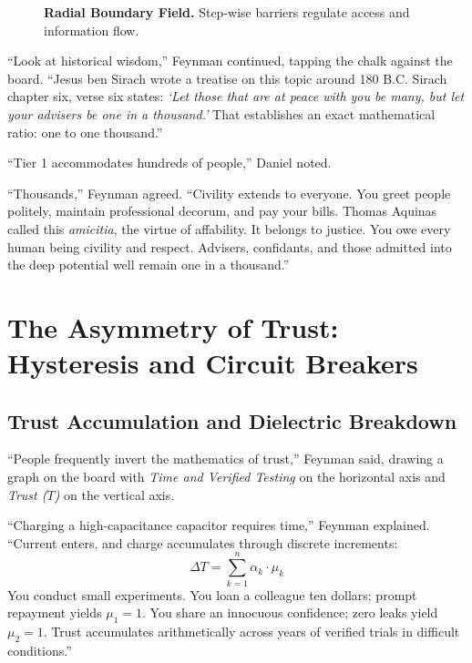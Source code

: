 \documentclass[11pt]{report}
\begin{document}
\begin{figure}[H]
\caption{\textbf{Radial Boundary Field.} Step-wise barriers regulate access and information flow.}
\label{fig:radialfield}
\end{figure}

``Look at historical wisdom,'' Feynman continued, tapping the chalk against the board. ``Jesus ben Sirach wrote a treatise on this topic around 180 B.C. Sirach chapter six, verse six states: \textit{`Let those that are at peace with you be many, but let your advisers be one in a thousand.'} That establishes an exact mathematical ratio: one to one thousand.''

``Tier 1 accommodates hundreds of people,'' Daniel noted.

``Thousands,'' Feynman agreed. ``Civility extends to everyone. You greet people politely, maintain professional decorum, and pay your bills. Thomas Aquinas called this \textit{amicitia}, the virtue of affability. It belongs to justice. You owe every human being civility and respect. Advisers, confidants, and those admitted into the deep potential well remain one in a thousand.''

\chapter{The Asymmetry of Trust: Hysteresis and Circuit Breakers}

\section{Trust Accumulation and Dielectric Breakdown}
``People frequently invert the mathematics of trust,'' Feynman said, drawing a graph on the board with \textit{Time and Verified Testing} on the horizontal axis and \textit{Trust ($T$)} on the vertical axis.

``Charging a high-capacitance capacitor requires time,'' Feynman explained. ``Current enters, and charge accumulates through discrete increments:
\begin{equation}
\Delta T = \sum_{k=1}^n \alpha_k \cdot \mu_k
\end{equation}
You conduct small experiments. You loan a colleague ten dollars; prompt repayment yields $\mu_1 = 1$. You share an innocuous confidence; zero leaks yield $\mu_2 = 1$. Trust accumulates arithmetically across years of verified trials in difficult conditions.''
\end{document}
